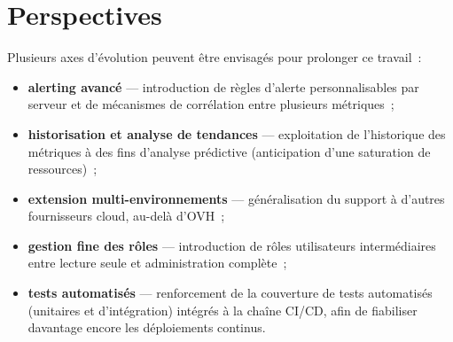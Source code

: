 \section*{Perspectives}

Plusieurs axes d'évolution peuvent être envisagés pour prolonger ce travail~:

\begin{itemize}
  \item \textbf{alerting avancé} — introduction de règles d'alerte personnalisables par serveur et de mécanismes de corrélation entre plusieurs métriques~;
  \item \textbf{historisation et analyse de tendances} — exploitation de l'historique des métriques à des fins d'analyse prédictive (anticipation d'une saturation de ressources)~;
  \item \textbf{extension multi-environnements} — généralisation du support à d'autres fournisseurs cloud, au-delà d'OVH~;
  \item \textbf{gestion fine des rôles} — introduction de rôles utilisateurs intermédiaires entre lecture seule et administration complète~;
  \item \textbf{tests automatisés} — renforcement de la couverture de tests automatisés (unitaires et d'intégration) intégrés à la chaîne CI/CD, afin de fiabiliser davantage encore les déploiements continus.
\end{itemize}
